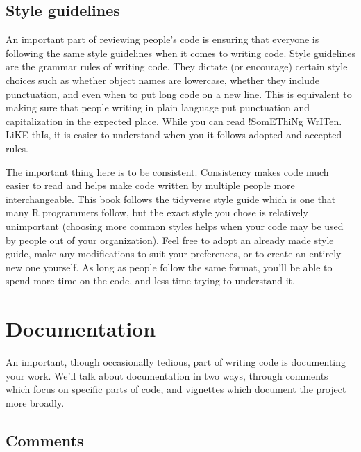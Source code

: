 \documentclass[
  12pt,
]{book}
\begin{document}
\hypertarget{style-guidelines}{%
\subsection{Style guidelines}\label{style-guidelines}}

An important part of reviewing people's code is ensuring that everyone is following the same style guidelines when it comes to writing code. Style guidelines are the grammar rules of writing code. They dictate (or encourage) certain style choices such as whether object names are lowercase, whether they include punctuation, and even when to put long code on a new line. This is equivalent to making sure that people writing in plain language put punctuation and capitalization in the expected place. While you can read !SomEThiNg WrITen. LiKE thIs, it is easier to understand when you it follows adopted and accepted rules.

The important thing here is to be consistent. Consistency makes code much easier to read and helps make code written by multiple people more interchangeable. This book follows the \href{https://style.tidyverse.org/}{tidyverse style guide} which is one that many R programmers follow, but the exact style you chose is relatively unimportant (choosing more common styles helps when your code may be used by people out of your organization). Feel free to adopt an already made style guide, make any modifications to suit your preferences, or to create an entirely new one yourself. As long as people follow the same format, you'll be able to spend more time on the code, and less time trying to understand it.

\hypertarget{documentation}{%
\section{Documentation}\label{documentation}}

An important, though occasionally tedious, part of writing code is documenting your work. We'll talk about documentation in two ways, through comments which focus on specific parts of code, and vignettes which document the project more broadly.

\hypertarget{comments}{%
\subsection{Comments}\label{comments}}
\end{document}
